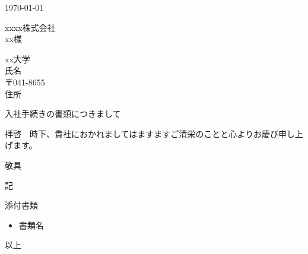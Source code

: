 \documentclass[a4j,10pt,titlepage]{jreport}
\begin{document}
\begin{flushright} %
\today %
\end{flushright}

\begin{flushleft} %
xxxx株式会社\\ %
xx様\\
\end{flushleft}

\begin{flushright} %
xx大学\\
氏名\\
〒041-8655\\
住所
\vspace{10mm}
\end{flushright}

\begin{center}
{\huge 入社手続きの書類につきまして}
\end{center}
\vspace{10mm}
拝啓　時下、貴社におかれましてはますますご清栄のことと心よりお慶び申し上げます。\\
\begin{flushright} %
敬具\\
\end{flushright}

\begin{center} %
記
\end{center}

\begin{flushleft} %
添付書類
\end{flushleft}

\begin{itemize} %
 \item 書類名
\end{itemize}

\begin{flushright} %
以上\\
\end{flushright}
\end{document}
